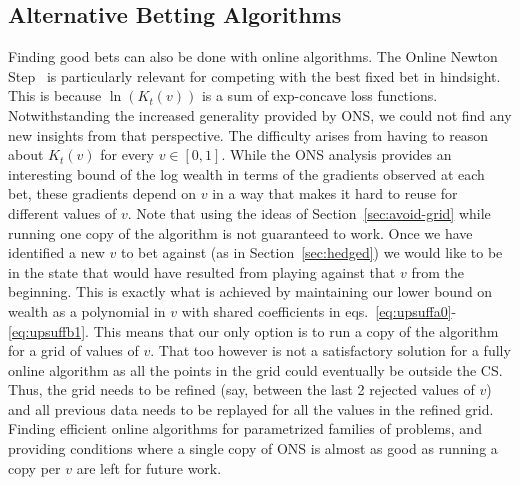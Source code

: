 \subsection{Alternative Betting Algorithms}
Finding good bets can also be done with online algorithms.  The Online Newton
Step~\cite{hazan2007logarithmic} is particularly relevant for competing with
the best fixed bet in hindsight. This is because $\ln(K_t(v))$ is a sum of
exp-concave loss functions. Notwithstanding the increased generality provided
by ONS, we could not find any new insights from that perspective. The
difficulty arises from having to reason about $K_t(v)$ for every $v \in [0,1]$.
While the ONS analysis provides an interesting bound of the log wealth in terms
of the gradients observed at each bet, these gradients depend on $v$ in a way
that makes it hard to reuse for different values of $v$.  Note that using the
ideas of Section~\ref{sec:avoid-grid} while running one copy of the algorithm
is not guaranteed to work. Once we have identified a new $v$ to bet against (as
in Section~\ref{sec:hedged}) we would like to be in the state that would have
resulted from playing against that $v$ from the beginning. This is exactly what
is achieved by maintaining our lower bound on wealth as a polynomial in $v$
with shared coefficients in eqs.~\eqref{eq:upsuffa0}-\eqref{eq:upsuffb1}.  This
means that our only option is to run a copy of the algorithm for a grid of
values of $v$. That too however is not a satisfactory solution for a fully
online algorithm as all the points in the grid could eventually be outside the
CS. Thus, the grid needs to be refined (say, between the last 2 rejected values
of $v$) and all previous data needs to be replayed for all the values in the
refined grid. Finding efficient online algorithms for parametrized families of
problems, and providing conditions where a single copy of ONS is almost as good
as running a copy per $v$ are left for future work.

